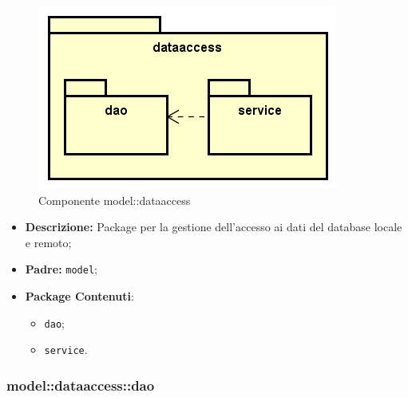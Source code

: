 \documentclass[../DefinizioneDiProdotto.tex]{subfiles}
\begin{document}
\begin{figure}[H]
	\centering
	\includegraphics[width=\maxwidth]{img/package/dataaccess.png}
	\caption{Componente model::\-dataaccess}\label{fig:model::dataaccess} 
\end{figure}
\begin{itemize}
	\item \textbf{Descrizione:} Package per la gestione dell'accesso ai dati del database locale e remoto;
	\item \textbf{Padre:} \texttt{model};
	\item \textbf{Package Contenuti}:
	\begin{itemize}
		\item \texttt{dao};
		
		\item \texttt{service}.
		
	\end{itemize}
\end{itemize}

\subsubsection{model::\-dataaccess::\-dao}
\end{document}
